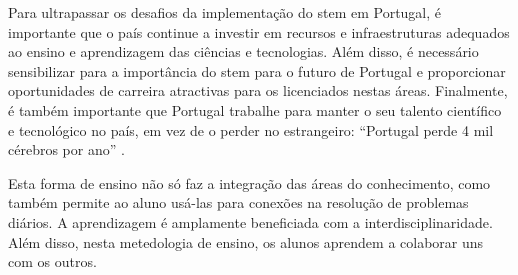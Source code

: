 
Para ultrapassar os desafios da implementação do \acrshort{stem} em Portugal, é importante que o país continue a investir em recursos e infraestruturas adequados ao ensino e aprendizagem das ciências e tecnologias. Além disso, é necessário sensibilizar para a importância do \acrshort{stem} para o futuro de Portugal e proporcionar oportunidades de carreira atractivas para os licenciados nestas áreas. Finalmente, é também importante que Portugal trabalhe para manter o seu talento científico e tecnológico no país, em vez de o perder no estrangeiro: ``Portugal perde 4 mil cérebros por ano'' \cite{Cerdeira2020}.






Esta forma de ensino não só faz a integração das áreas do conhecimento, como também permite ao aluno usá-las para conexões na resolução de problemas diários. A aprendizagem é amplamente beneficiada com a interdisciplinaridade. Além disso, nesta metedologia de ensino, os alunos aprendem a colaborar uns com os outros.

